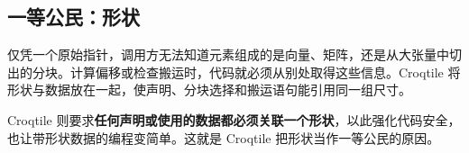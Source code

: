 \subsection*{一等公民：形状}

仅凭一个原始指针，调用方无法知道元素组成的是向量、矩阵，还是从大张量中切出的分块。计算偏移或检查搬运时，代码就必须从别处取得这些信息。Croqtile 将形状与数据放在一起，使声明、分块选择和搬运语句能引用同一组尺寸。

Croqtile 则要求\textbf{任何声明或使用的数据都必须关联一个形状}，以此强化代码安全，也让带形状数据的编程变简单。这就是 Croqtile 把形状当作一等公民的原因。
